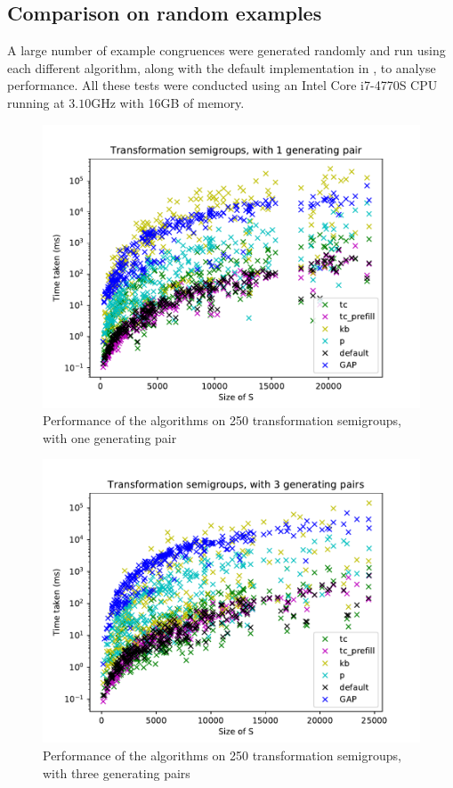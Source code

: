 \subsection{Comparison on random examples}
A large number of example congruences were generated randomly and run using each
different algorithm, along with the default implementation in \GAP{} \cite{gap}, to
analyse performance.  All these tests were conducted using an Intel Core
i7-4770S CPU running at $3.10$GHz with 16GB of memory.

\begin{figure}[p]
  \centering
  \includegraphics[width=\textwidth]{pics/ch-pairs/bench-trans-1p-times}
  \caption[Benchmark: all algorithms, concrete, 1 pair]
  {Performance of the algorithms on 250 transformation semigroups, with
    one generating pair}
  \label{fig:bench-trans-1p-times}
\end{figure}

\begin{figure}[p]
  \centering
  \includegraphics[width=\textwidth]{pics/ch-pairs/bench-trans-3p-times}
  \caption[Benchmark: all algorithms, concrete, 3 pairs]
  {Performance of the algorithms on 250 transformation semigroups, with
    three generating pairs}
  \label{fig:bench-trans-3p-times}
\end{figure}

